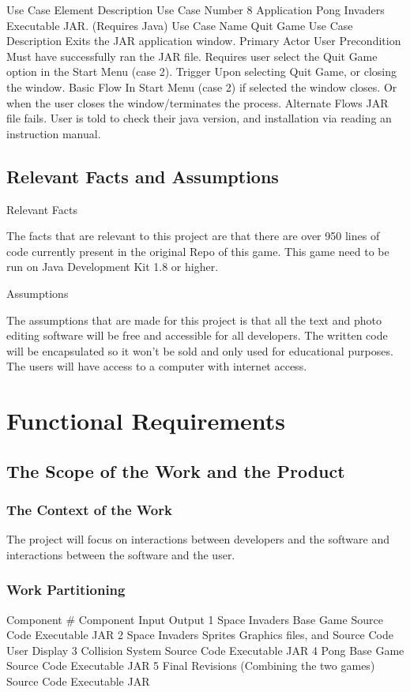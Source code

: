 \documentclass[12pt, titlepage]{article}
\begin{document}
Use Case Element
Description
Use Case Number
8
Application
Pong Invaders Executable JAR. (Requires Java)
Use Case Name
Quit Game
Use Case Description
Exits the JAR application window.
Primary Actor
User 
Precondition
Must have successfully ran the JAR file. Requires user select the Quit Game option in the Start Menu (case 2).
Trigger
Upon selecting Quit Game, or closing the window.
Basic Flow
In Start Menu (case 2) if selected the window closes. Or when the user closes the window/terminates the process.
Alternate Flows
JAR file fails. User is told to check their java version, and installation via reading an instruction manual.


\subsection{Relevant Facts and Assumptions}
Relevant Facts


The facts that are relevant to this project are that there are over 950 lines of code currently present in the original Repo of this game. This game need to be run on Java Development Kit 1.8 or higher.

Assumptions

The assumptions that are made for this project  is that all the text and photo editing software will be free and accessible for all developers. The written code will be encapsulated so it won’t be sold and only used for educational purposes. The users will have access to a computer with internet access. 

\section{Functional Requirements}
\subsection{The Scope of the Work and the Product}
\subsubsection{The Context of the Work}
The project will focus on interactions between developers and the software and interactions between the software and the user.

\subsubsection{Work Partitioning}

Component #
Component
Input
Output
1
Space Invaders Base Game
Source Code
Executable JAR
2
Space Invaders Sprites
Graphics files, and Source Code
User Display
3
Collision System
Source Code
Executable JAR
4
Pong Base Game
Source Code
Executable JAR
5
Final Revisions (Combining the two games)
Source Code
Executable JAR
\end{document}
